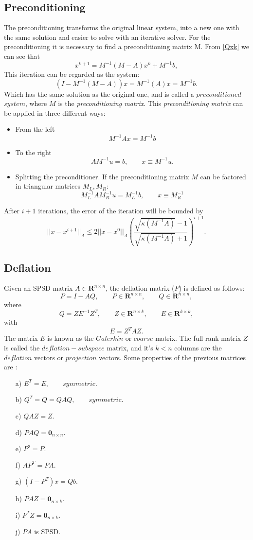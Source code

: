 \documentclass[a4paper,10pt]{report}
\begin{document}
\subsection{Preconditioning}
The preconditioning transforms the original linear system, into a new one with the same solution and easier to solve
with an iterative solver. For the preconditioning it is necessary to find a preconditioning matrix M. From \eqref{Qxk} we can see that
\begin{equation*}
 x^{k+1}=M^{-1}(M-A)x^{k}+M^{-1}b,
\end{equation*}
This iteration can be regarded as the system:
$$(I-M^{-1}(M-A))x=M^{-1}(A)x=M^{-1}b.$$
Which has the same solution as the original one, and is called a $preconditioned$ $system$, where
$M$ is the \emph{preconditioning matrix}.
This \emph{preconditioning matrix} can be applied in three different ways:
\begin{itemize}
\item{From the left} 
$$M^{-1}Ax=M^{-1}b$$
\item{To the right}
$$AM^{-1}u=b, \qquad x\equiv M^{-1}u.$$
\item{Splitting the preconditioner.} If the preconditioning matrix $M$ can be factored in triangular matrices $M_L, M_R$:
$$M^{-1}_LAM_R^{-1}u=M_L^{-1}b, \qquad x\equiv M_R^{-1}$$
\end{itemize}
After $i+1$ iterations, the error of the iteration will be bounded by
\begin{equation*}
 ||x-x^{i+1}||_A\leq 2||x-x^{0}||_A \left( \frac{\sqrt{\kappa(M^{-1}A)}-1}{\sqrt{\kappa(M^{-1}A)}+1} \right)^{i+1}.
\end{equation*}


\subsection{Deflation}
Given an SPSD matrix $A \in \mathbf{R}^{n \times n}$, the deflation matrix ($P$) is defined as follows:
$$P=I-AQ, \qquad P \in \mathbf{R}^{n \times n}, \qquad Q \in \mathbf{R}^{n \times n},$$
where
$$Q=ZE^{-1}Z^T, \qquad Z \in \mathbf{R}^{n \times k}, \qquad E \in \mathbf{R}^{k \times k}, $$
with
$$E=Z^TAZ.$$
The matrix $E$ is known as the $Galerkin$ or $coarse$ matrix. The full rank matrix $Z$ is called the $deflation-subspace$ matrix, 
and it's $k<n$ columns are the
$deflation$ vectors or $projection$ vectors.
Some properties of the previous matrices are \cite{Tang08} :
\begin{enumerate}
 \item[a)] $E^T=E, \qquad symmetric.$
 \item[b)] $Q^T=Q=QAQ, \qquad symmetric.$
 \item[c)] $QAZ=Z.$
 \item[d)] $PAQ=\mathbf{0}_{n\times n}.$
 \item[e)] $P^2=P.$
 \item[f)] $AP^T=PA.$
 \item[g)] $(I-P^T)x=Qb.$
 \item[h)] $PAZ=\mathbf{0}_{n\times k}.$
 \item[i)] $P^TZ=\mathbf{0}_{n\times k}.$
 \item[j)] $PA$ is SPSD. 
\end{enumerate}
\end{document}
